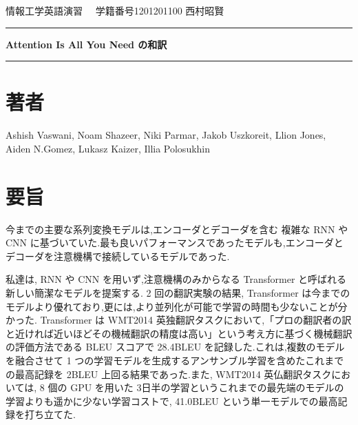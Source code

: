 \documentclass{jarticle}     %
\begin{document}
  \noindent
  \onecolumn
  \hspace{1em}

  情報工学英語演習
  \hfill
  \ \  学籍番号1201201100 西村昭賢 

  \vspace{2mm}
  \hrule
  \begin{center}
  {\Large \bf Attention Is All You Need の和訳}
  \end{center}
  \hrule
  \vspace{3mm}

\section*{著者}
Ashish Vaswani, Noam Shazeer, Niki Parmar, Jakob Uszkoreit, Llion Jones, Aiden N.Gomez, Lukasz Kaizer, Illia Polosukhin\cite{Transformer}

\section*{要旨}
今までの主要な系列変換モデルは,エンコーダとデコーダを含む
複雑な RNN や CNN に基づいていた.最も良いパフォーマンスであったモデルも,エンコーダとデコーダを注意機構で接続しているモデルであった.\par
私達は, RNN や CNN を用いず,注意機構のみからなる Transformer と呼ばれる新しい簡潔なモデルを提案する. 2 回の翻訳実験の結果, Transformer は今までのモデルより優れており,更には,より並列化が可能で学習の時間も少ないことが分かった.
Transformer は WMT2014 英独翻訳タスクにおいて,「プロの翻訳者の訳と近ければ近いほどその機械翻訳の精度は高い」という考え方に基づく機械翻訳の評価方法である BLEU スコア\cite{BLEU}で 28.4BLEU を記録した.これは,複数のモデルを融合させて 1 つの学習モデルを生成するアンサンブル学習\cite{ensemble}を含めたこれまでの最高記録を 2BLEU 上回る結果であった.また, WMT2014 英仏翻訳タスクにおいては, 8 個の GPU を用いた 3日半の学習というこれまでの最先端のモデルの学習よりも遥かに少ない学習コストで, 41.0BLEU という単一モデルでの最高記録を打ち立てた.

\end{document}
